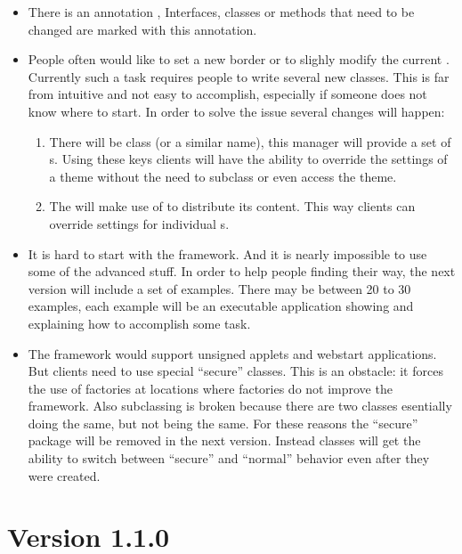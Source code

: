 \begin{itemize}
 \item There is an annotation , Interfaces, classes or methods that need to be changed are marked with this annotation.
 \item People often would like to set a new border or to slighly modify the current . Currently such a task requires people to write several new classes. This is far from intuitive and not easy to accomplish, especially if someone does not know where to start. In order to solve the issue several changes will happen:
 \begin{enumerate}
  \item There will be class  (or a similar name), this manager will provide a set of s. Using these keys clients will have the ability to override the settings of a theme without the need to subclass or even access the theme.
  \item The  will  make use of  to distribute its content. This way clients can override settings for individual s.
 \end{enumerate}
 \item It is hard to start with the framework. And it is nearly impossible to use some of the advanced stuff. In order to help people finding their way, the next version will include a set of examples. There may be between 20 to 30 examples, each example will be an executable application showing and explaining how to accomplish some task.
 \item The framework would support unsigned applets and webstart applications. But clients need to use special ``secure'' classes. This is an obstacle: it forces the use of factories at locations where factories do not improve the framework. Also subclassing is broken because there are two classes esentially doing the same, but not being the same. For these reasons the ``secure'' package will be removed in the next version. Instead classes will get the ability to switch between ``secure'' and ``normal'' behavior even after they were created.
\end{itemize}


\section{Version 1.1.0}
